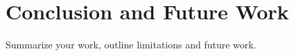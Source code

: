 \section{Conclusion and Future Work}
Summarize your work, outline limitations and future work. 












